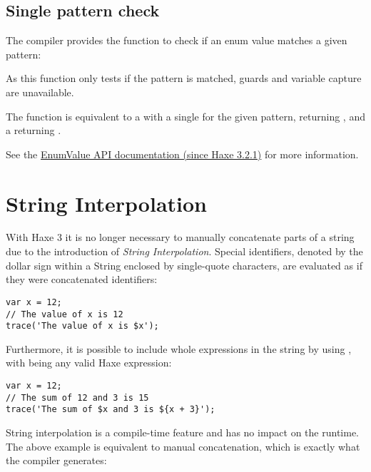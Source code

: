 \subsection{Single pattern check}
\label{lf-pattern-matching-single}

The compiler provides the function  to check if an enum value matches a given pattern:


As this function only tests if the pattern is matched, guards and variable capture are unavailable.

The  function is equivalent to a  with a single  for the given pattern, returning , and a  returning .


See the \href{https://api.haxe.org/haxe/EnumValueTools.html#match}{EnumValue API documentation (since Haxe 3.2.1)} for more information.



\section{String Interpolation}
\label{lf-string-interpolation}

With Haxe 3 it is no longer necessary to manually concatenate parts of a string due to the introduction of \emph{String Interpolation}. Special identifiers, denoted by the dollar sign \expr{\$} within a String enclosed by single-quote  characters, are evaluated as if they were concatenated identifiers:

\begin{lstlisting}
var x = 12;
// The value of x is 12
trace('The value of x is $x');
\end{lstlisting}
Furthermore, it is possible to include whole expressions in the string by using , with  being any valid Haxe expression:

\begin{lstlisting}
var x = 12;
// The sum of 12 and 3 is 15
trace('The sum of $x and 3 is ${x + 3}');
\end{lstlisting}
String interpolation is a compile-time feature and has no impact on the runtime. The above example is equivalent to manual concatenation, which is exactly what the compiler generates:

